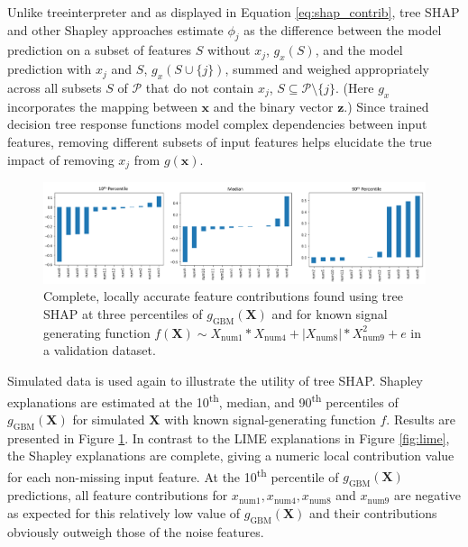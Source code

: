 \documentclass[sigconf]{acmart}
\begin{document}
\noindent Unlike treeinterpreter and as displayed in Equation \ref{eq:shap_contrib}, tree SHAP and other Shapley approaches estimate $\phi_j$ as the difference between the model prediction on a subset of features $S$ without $x_j$, $g_x(S)$, and the model prediction with $x_j$ and $S$, $g_x(S \cup \{j\})$, summed and weighed appropriately across all subsets $S$ of $\mathcal{P}$ that do not contain $x_j$, $S \subseteq \mathcal{P} \setminus \{j\}$. (Here $g_x$ incorporates the mapping between $\mathbf{x}$ and the binary vector $\mathbf{z}$.) Since trained decision tree response functions model complex dependencies between input features, removing different subsets of input features helps elucidate the true impact of removing $x_j$ from $g(\mathbf{x})$.

\begin{figure}[htb]
	\begin{center}
		\includegraphics[scale=0.55]{img/figure_6_lo.png}
		\caption{Complete, locally accurate feature contributions found using tree SHAP at three percentiles of $g_{\text{GBM}}(\mathbf{X})$ and for known signal generating function $f(\mathbf{X}) \sim X_{\text{num}1} * X_{\text{num}4} + |X_{\text{num}8}| * X_{\text{num}9}^2 + e$ in a validation dataset.}
		\label{fig:shap}
	\end{center}
\end{figure}

Simulated data is used again to illustrate the utility of tree SHAP. Shapley explanations are estimated at the 10\textsuperscript{th}, median, and 90\textsuperscript{th} percentiles of $g_{\text{GBM}}(\mathbf{X})$ for simulated $\mathbf{X}$ with known signal-generating function $f$. Results are presented in Figure \ref{fig:shap}. In contrast to the LIME explanations in Figure \ref{fig:lime}, the Shapley explanations are complete, giving a numeric local contribution value for each non-missing input feature. At the 10\textsuperscript{th} percentile of $g_{\text{GBM}}(\mathbf{X})$ predictions, all feature contributions for $x_{\text{num}1}, x_{\text{num}4}, x_{\text{num}8}$ and $x_{\text{num}9}$ are negative as expected for this relatively low value of $g_{\text{GBM}}(\mathbf{X})$ and their contributions obviously outweigh those of the noise features.
\end{document}
